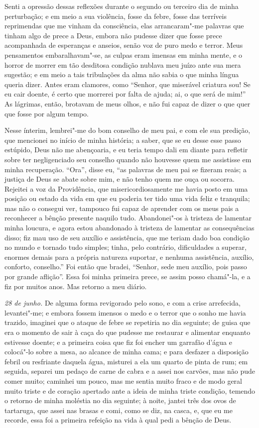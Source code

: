 Senti a opressão dessas reflexões durante o segundo ou terceiro dia de
minha perturbação; e em meio a sua violência, fosse da febre, fosse das
terríveis reprimendas que me vinham da consciência, elas arrancaram"-me
palavras que tinham algo de prece a Deus, embora não pudesse dizer que
fosse prece acompanhada de esperanças e anseios, senão voz de puro medo
e terror. Meus pensamentos embaralhavam"-se, as culpas eram imensas em
minha mente, e o horror de morrer em tão desditosa condição nublava meu
juízo ante sua mera sugestão; e em meio a tais tribulações da alma não
sabia o que minha língua queria dizer. Antes eram clamores, como
``Senhor, que miserável criatura sou! Se eu cair doente, é certo que
morrerei por falta de ajuda; ai, o que será de mim!'' As lágrimas,
então, brotavam de meus olhos, e não fui capaz de dizer o que quer que
fosse por algum tempo.

Nesse ínterim, lembrei"-me do bom conselho de meu pai, e com ele sua
predição, que mencionei no início de minha história; a saber, que se eu
desse esse passo estúpido, Deus não me abençoaria, e eu teria tempo dali
em diante para refletir sobre ter negligenciado seu conselho quando não
houvesse quem me assistisse em minha recuperação. ``Ora'', disse eu,
``as palavras de meu pai se fizeram reais; a justiça de Deus se abate
sobre mim, e não tenho quem me ouça ou socorra. Rejeitei a voz da
Providência, que misericordiosamente me havia posto em uma posição ou
estado da vida em que eu poderia ter tido uma vida feliz e tranquila;
mas não o consegui ver, tampouco fui capaz de aprender com os meus pais
a reconhecer a bênção presente naquilo tudo. Abandonei"-os à tristeza de
lamentar minha loucura, e agora estou abandonado à tristeza de lamentar
as consequências disso; fiz mau uso de seu auxílio e assistência, que me
teriam dado boa condição no mundo e tornado tudo simples; tinha, pelo
contrário, dificuldades a superar, enormes demais para a própria
natureza suportar, e nenhuma assistência, auxílio, conforto, conselho.''
Foi então que bradei, ``Senhor, sede meu auxílio, pois passo por grande
aflição''. Essa foi minha primeira prece, se assim posso chamá"-la, e a
fiz por muitos anos. Mas retorno a meu diário.

\emph{28 de junho.} De alguma forma revigorado pelo sono, e com a crise
arrefecida, levantei"-me; e embora fossem imensos o medo e o terror que o
sonho me havia trazido, imaginei que o ataque de febre se repetiria no
dia seguinte; de guisa que era o momento de sair à caça do que pudesse
me restaurar e alimentar enquanto estivesse doente; e a primeira coisa
que fiz foi encher um garrafão d'água e colocá"-lo sobre a mesa, ao
alcance de minha cama; e para desfazer a disposição febril ou resfriante
daquela água, misturei a ela um quarto de pinta de rum; em seguida,
separei um pedaço de carne de cabra e a assei nos carvões, mas não pude
comer muito; caminhei um pouco, mas me sentia muito fraco e de modo
geral muito triste e de coração apertado ante a ideia de minha triste
condição, temendo o retorno de minha moléstia no dia seguinte; à noite,
jantei três dos ovos de tartaruga, que assei nas brasas e comi, como se
diz, na casca, e, que eu me recorde, essa foi a primeira refeição na
vida à qual pedi a bênção de Deus.

